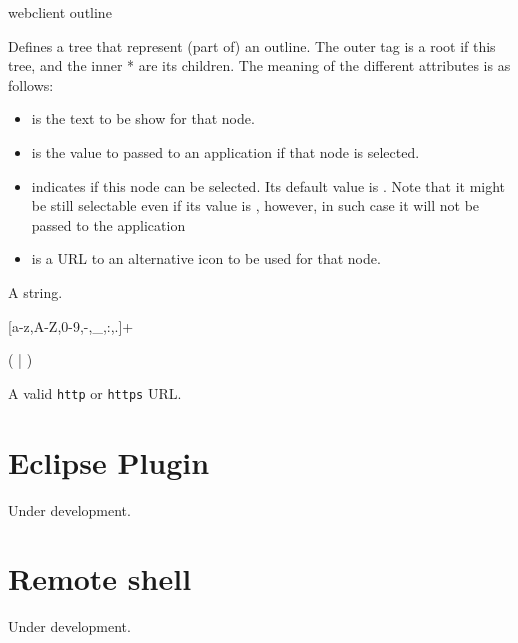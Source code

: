 \bigskip
\xmlstruct
{webclient}
{outline}
{%
%
  Defines a tree that represent (part of) an outline. The outer
   tag is a root if this tree, and the inner
  * are its children. The meaning of
  the different attributes is as follows:
%
\begin{itemize}
  \item {} is the text to be show for that node.
  \item {} is the value to passed to an application if that node is selected.
  \item {} indicates if this node can be
    selected. Its default value is . Note that it
    might be still selectable even if its value is
    , however, in such case it will not be
    passed to the application
  \item {} is a URL to an alternative icon to be
    used for that node.
\end{itemize}
%
\bigskip
\noindent
{}

A string.

\bigskip
\noindent
{}

[a-z,A-Z,0-9,-,\_,:,.]+

\bigskip
\noindent
{}

(  |  )

\bigskip
\noindent
{}

A valid \texttt{http} or \texttt{https} URL.
}



\section{Eclipse Plugin}
\label{ch:clients:eclipse}

Under development. 

\section{Remote shell}
\label{ch:clients:shell}

Under development. 
